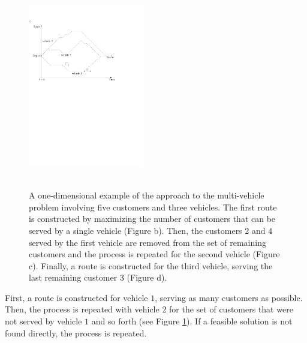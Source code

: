 \documentclass[dissertation,draft*]{aaltoseries}
\newtheorem*{definition}{Definition}
\begin{document}
\begin{figure}[ht]
\includegraphics[width=0.45\textwidth]{greedy07b.pdf}  \\ \ \\   
\caption{A one-dimensional example of the approach to the multi-vehicle problem involving five customers 
and three vehicles. The first route is constructed by maximizing 
the number of customers that can be served by a single vehicle (Figure b). 
Then, the customers $2$ and $4$ served by the first vehicle are removed from the set of remaining customers and the process 
is repeated for the second vehicle (Figure c). Finally, a route is constructed for the third vehicle, serving the
last remaining customer $3$ (Figure d).
}
\label{greedyidea}
\end{figure}

First, a route is constructed for vehicle $1$, serving as many 
customers as possible. Then, the process is repeated with vehicle $2$ for the set of customers
that were not served by vehicle $1$ and so forth (see Figure \ref{greedyidea}). 
If a feasible solution is not found directly, %
the process is repeated. 
% 
\end{document}
